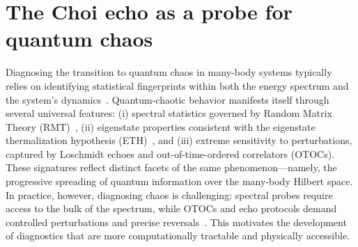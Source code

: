 \documentclass[pra,twocolumn,aps,showpacs,superscriptaddress,longbibliography]{revtex4-2}%
\begin{document}
\section{The Choi echo as a probe for quantum chaos}\label{sec:chaos_probe}

Diagnosing the transition to quantum chaos in many-body systems typically relies on identifying statistical fingerprints within both the energy spectrum and the system's dynamics~\cite{dalessio_2016_quantum}. Quantum-chaotic behavior manifests itself through several universal features: (i) spectral statistics governed by Random Matrix Theory (RMT)~\cite{bohigas_1984_characterization}, (ii) eigenstate properties consistent with the eigenstate thermalization hypothesis (ETH)~\cite{deutsch_1991_quantum}, and (iii) extreme sensitivity to perturbations, captured by Loschmidt echoes and out-of-time-ordered correlators (OTOCs). These signatures reflect distinct facets of the same phenomenon—namely, the progressive spreading of quantum information over the many-body Hilbert space. 
In practice, however, diagnosing chaos is challenging: spectral probes require access to the bulk of the spectrum, while OTOCs and echo protocols demand controlled perturbations and precise reversals~\cite{bardarson2012unbounded,santos2010onset,alba2017entanglement,smith2016many}.
This motivates the development of diagnostics that are more computationally tractable and physically accessible.
\end{document}
